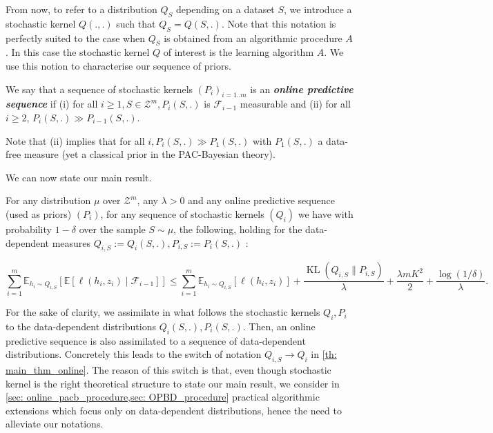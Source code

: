 From now, to refer to a distribution $Q_S$ depending on a dataset $S$, we introduce a stochastic kernel $Q(.,.)$ such that $Q_S = Q(S,.)$. Note that this notation is perfectly suited to the case when $Q_S$ is obtained from an algorithmic procedure $A$. In this case the stochastic kernel $Q$ of interest is the learning algorithm $A$.
We use this notion to characterise our sequence of priors.

\begin{definition}
  We say that a sequence of stochastic kernels $(P_i)_{i=1..m}$ is an \emph{\textbf{online predictive sequence}} if (i) for all $i\geq 1, S\in\mathcal{Z}^m, P_i(S,.)$ is $\mathcal{F}_{i-1}$ measurable and (ii) for all $i \geq 2$, $P_i(S,.)\gg P_{i-1}(S,.)$.
\end{definition}

Note that (ii) implies that for all $i, P_i(S,.)\gg P_1(S,.)$ with $P_1(S,.)$ a data-free measure (yet a classical prior in the PAC-Bayesian theory).


We can now state our main result.

\begin{theorem}
  \label{th: main_thm_online}
  For any distribution $\mu$ over $\mathcal{Z}^m$, any $\lambda>0$ and any online predictive sequence (used as priors) $(P_i)$, for any sequence of stochastic kernels $(Q_i)$ we have with probability $1-\delta$ over the sample $S\sim\mu$, the following, holding for the data-dependent measures $Q_{i,S}:= Q_i(S,.), P_{i,S}:= P_i(S,.)$ :

  \[ \sum_{i=1}^m \mathbb{E}_{h_i\sim Q_{i,S}}\left[ \mathbb{E}[\ell(h_i,z_i) \mid \mathcal{F}_{i-1}]    \right]  \leq \sum_{i=1}^m \mathbb{E}_{h_i\sim Q_{i,S}}\left[ \ell(h_i,z_i) \right] + \frac{\operatorname{KL}(Q_{i,S}\| P_{i,S})}{\lambda} + \frac{\lambda m K^2}{2} + \frac{\log(1/\delta)}{\lambda}. \]

\end{theorem}

\begin{remark}
  \label{rem: notations}
  For the sake of clarity, we assimilate in what follows the stochastic kernels $Q_i,P_i$ to the data-dependent distributions $Q_i(S,.), P_i(S,.)$. Then, an online predictive sequence is also assimilated to a sequence of data-dependent distributions. Concretely this leads to the switch of notation $Q_{i,S}\rightarrow Q_i$ in \cref{th: main_thm_online}. The reason of this switch is that, even though stochastic kernel is the right theoretical structure to state our main result, we consider in \cref{sec: online_pacb_procedure,sec: OPBD_procedure} practical algorithmic extensions which focus only on data-dependent distributions, hence the need to alleviate our notations.
\end{remark}

